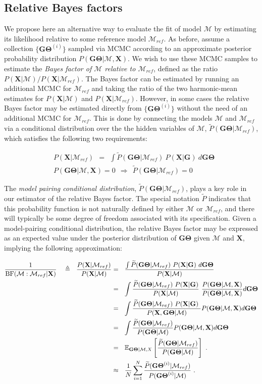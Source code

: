 \documentclass[11pt]{article}
\newcommand{\vect}[1]{\boldsymbol{\mathbf{#1}}}
\newcommand{\E}{\mathbb{E}}
\newcommand{\X}{\vect{X}}
\newcommand{\M}{\mathcal{M}}
\newcommand{\G}{\vect{G}}
\newcommand{\T}{\vect{\Theta}}
\newcommand{\GT}{\G\T}
\newcommand{\Mref}{\M_{ref}}
\newcommand{\Pref}{\widetilde{P}}
\newcommand{\rbf}{\text{BF}}
\newcommand{\1}{\mathbbm{1}}
\begin{document}
\subsection{Relative Bayes factors}
\label{Relative Bayes factors}

We propose here an alternative way to evaluate the fit of model $\M$ by estimating its likelihood relative to some
reference model $\Mref$. 
%
As before, assume a collection $\{\GT^{(i)}\}$ sampled via MCMC according to an approximate posterior probability distribution $P(\GT|\M,\X)$.
%
We wish to use these MCMC samples to estimate the {\em Bayes factor of $\M$ relative to $\Mref$}, defined as the ratio $P(\X|\M) / P(\X|\Mref)$.
%
The Bayes factor can be estimated by running an additional MCMC for $\Mref$ and taking the ratio of the two harmonic-mean estimates for $P(\X|\M)$ and $P(\X|\Mref)$.
%
However, in some cases the relative Bayes factor may be estimated directly from $\{\GT^{(i)}\}$ without the need of an additional MCMC for $\Mref$.
%
This is done by connecting the models $\M$ and $\Mref$ via a conditional distribution over the the hidden variables of $\M$, $\Pref(\GT|\Mref)$,
which satisfies the following two requirements:
%
%
\begin{small}
\begin{align}
&P(\X|\Mref) ~~=~~ \int  \Pref(\GT|\Mref)\ P(\X|\G)\ d\GT \label{eq:pref_integral}\\
&P(\GT|\M,\X)=0 ~~\Rightarrow~~ \Pref(\GT|\Mref)=0 \label{eq:pref_support}
\end{align}
\end{small}
%
%


The \emph{model pairing conditional distribution}, $\Pref(\GT|\Mref)$, plays a key role in our estimator of the relative Bayes factor.
%
The special notation $\Pref$ indicates that this probability function is not naturally defined by either
$\M$ or $\Mref$, and there will typically be some degree of freedom associated with its specification.
%
Given a model-pairing conditional distribution, the relative Bayes factor  may be expressed as an expected value under the posterior distribution of $\GT$ given $\M$ and $\X$,
implying the following approximation:
%
%
\begin{small}
\begin{align}
\frac{1}{\rbf(\M:\Mref|\X)} ~~~ \triangleq ~~ \frac{P(\X|\Mref)}{P(\X|\M)}
&=~~ \frac{\int  \Pref(\GT|\Mref)\ P(\X|\G)\ d\GT}{P(\X|\M)} \label{eq:pref1} \\ %
&=~~ \int \frac{\Pref(\GT|\Mref)\ P(\X|\G) }{P(\X|\M)} \ \frac{P(\GT|\M, \X)}{P(\GT|\M, \X)}  d\GT \label{eq:pref2} \\ %
&=~~ \int \frac{\Pref(\GT|\Mref)\ P(\X|\G)\ }{P(\X,\GT|\M)} P(\GT|\M, \X)  d\GT \notag \\ %
&=~~ \int \frac{\Pref(\GT|\Mref) }{P(\GT|\M)} P(\GT|\M, \X)  d\GT  \label{eq:data_cancel}\\ %
&=~~ \E_{\GT|\M,X } \left[\frac{\Pref(\GT|\Mref) }{P(\GT|\M)}\right]~.\notag \\
&\approx~~ \frac{1}{N} \sum_{i=1}^{N}\frac{\Pref(\GT^{(i)}|\Mref) }{P(\GT^{(i)}|\M)} ~.\label{eq:rbf}
\end{align}
\end{small}
%
%
\end{document}

